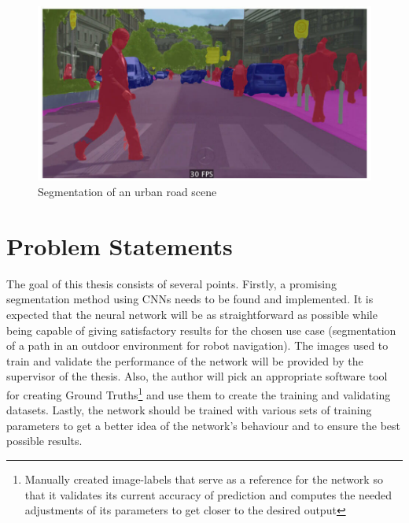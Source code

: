 \vspace{5mm}
\begin{figure}[htb]
	\begin{center}
		\includegraphics*[width=13cm, keepaspectratio]{obr/semseg.jpg}
	\end{center}
	\caption{Segmentation of an urban road scene \cite{sergios}} 
	\label{segment}
\end{figure}

\chapter{Problem Statements}
The goal of this thesis consists of several points. Firstly, a promising segmentation method using CNNs needs to be found and implemented. It is expected that the neural network will be as straightforward as possible while being capable of giving satisfactory results for the chosen use case (segmentation of a path in an outdoor environment for robot navigation). The images used to train and validate the performance of the network will be provided by the supervisor of the thesis. Also, the author will pick an appropriate software tool for creating Ground Truths\footnote{Manually created image-labels that serve as a reference for the network so that it validates its current accuracy of prediction and computes the needed adjustments of its parameters to get closer to the desired output} and use them to create the training and validating datasets. Lastly, the network should be trained with various sets of training parameters to get a better idea of the network's behaviour and to ensure the best possible results. 

